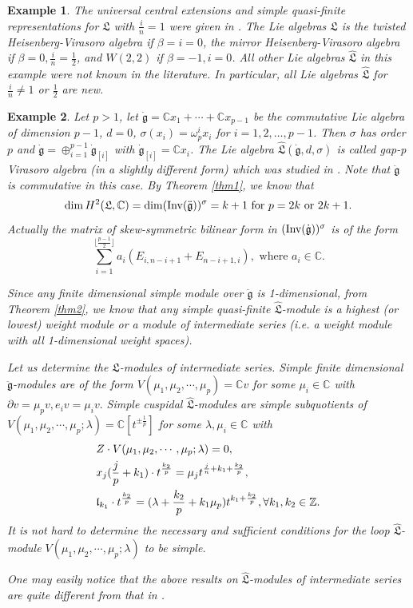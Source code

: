\documentclass[1p]{elsarticle}
\numberwithin{equation}{section}
\def\dg{\dot{\mathfrak{g}}}
\def\ddg{\ddot{\mathfrak{g}}}
\def\fL{\mathfrak{L}}
\def\bC{\mathbb{C}}
\def\bZ{\mathbb{Z}}
\def\Inv{{\rm Inv}}
\def\fl{\mathfrak{l}}
\def\hL{\hat{\fL}}
\newtheorem{exam}{Example}
\begin{document}
\begin{exam}
The universal central extensions and simple quasi-finite representations for $\fL$ with $\frac in= 1$ were given in \cite{GJP,L}. The Lie algebras
$\hL$ is  the twisted Heisenberg-Virasoro algebra if $\beta=i=0$,  the mirror Heisenberg-Virasoro algebra if $\beta=0,\frac in=\frac 12$, and $W(2,2)$ if $\beta=-1,i=0$. All other Lie algebras $\hL$ in this example were not known in the literature. In particular, all Lie algebras $\hL$ for $\frac in\ne 1$ or $\frac12$ are new.
\end{exam}


\begin{exam} Let $p>1$, let $\dg=\bC x_1+\cdots+\bC x_{p-1}$ be the commutative Lie algebra of dimension $p-1$, $d=0$, $\sigma(x_i)=\omega_p^i x_i$ for $ i=1,2,\ldots,p-1$. Then $\sigma$ has order $p$ and $\dg=\oplus_{i=1}^{p-1}{\dg}_{[i]}$ with $\dg_{[i]}=\bC x_i$. The Lie algebra $\hL(\dg,d,\sigma)$ is called gap-p Virasoro algebra (in a slightly different form) which was studied in \cite{X}. Note that $\ddg$ is commutative in this case. By Theorem \ref{thm1}, we know that $$\dim H^2(\fL,\bC)=\dim (\Inv(\ddg))^{\sigma}=k+1\text{ for }p=2k {\text{ or }}2k+1.$$ 
	Actually the matrix of skew-symmetric bilinear form in $(\Inv(\dg))^{\sigma}$ is of the form
	$$\sum_{i=1}^{\lfloor{\frac{p-1}2}\rfloor} a_i(E_{i, n-i+1}+E_{ n-i+1,i}), \text{ where }a_i\in\bC.$$
	
	Since any finite dimensional simple module  over $\ddg$ is 1-dimensional, from Theorem \ref{thm2}, we know that any simple quasi-finite $\hL$-module is a highest (or lowest) weight module or a module of intermediate series (i.e. a weight module with all 1-dimensional weight spaces).
	
	Let us determine the $\hL$-modules of intermediate series. Simple finite dimensional  $\ddg$-modules are of the form $V(\mu_1, \mu_2,\cdots, \mu_{p})=\bC v$ for some $\mu_i\in\bC$ with $\partial v=\mu_p v, e_i v=\mu_i v.$ Simple cuspidal $\hL$-modules are simple subquotients of $V(\mu_1, \mu_2,\cdots, \mu_{p}; \lambda)=\bC[t^{\pm \frac1p}]$ for some $\lambda,\mu_i\in\bC$  with  
	$$\aligned & Z\cdot V(\mu_1, \mu_2,\cdots, \mu_{p}; \lambda) =0, \\ &x_j(\frac {j}p+k_1)\cdot t^{\frac{k_2}{p}}=\mu_jt^{\frac {j}n+k_1+\frac{k_2}{p}},\\
	&\fl_{k_1}\cdot t^{\frac{k_2}{p}}=(\lambda+\frac{k_2}{p}+k_1\mu_p )t^{ {k_1}+\frac{k_2}{p}}, \forall k_1,k_2\in\bZ.
	\endaligned$$
	It is not hard to determine the necessary and sufficient conditions for the loop $\hL$-module $V(\mu_1, \mu_2,\cdots, \mu_{p}; \lambda)$ to be simple.
	
	One may easily notice that the above results on $\hL$-modules of  intermediate series are quite different from that in \cite{X}.
\end{exam}
\end{document}
